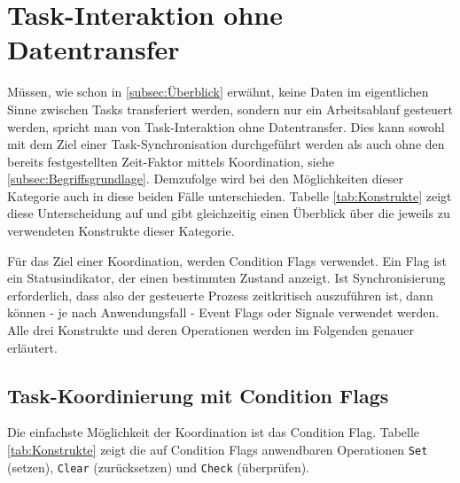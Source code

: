 \documentclass{llncs}
\begin{document}
\section{Task-Interaktion ohne Datentransfer}
\label{sub:Task_Interaktion_ohne_Datentransfer}
Müssen, wie schon in \ref{subsec:Überblick} erwähnt, keine Daten im eigentlichen Sinne zwischen Tasks transferiert werden, sondern nur ein Arbeitsablauf gesteuert werden, spricht man von Task-Interaktion ohne Datentransfer. Dies kann sowohl mit dem Ziel einer Task-Synchronisation durchgeführt werden als auch ohne den bereits festgestellten Zeit-Faktor mittels Koordination, siehe \ref{subsec:Begriffsgrundlage}. Demzufolge wird bei den Möglichkeiten dieser Kategorie auch in diese beiden Fälle unterschieden. Tabelle \ref{tab:Konstrukte} zeigt diese Unterscheidung auf und gibt gleichzeitig einen Überblick über die jeweils zu verwendeten Konstrukte dieser Kategorie.
\begin{table}
	\centering %
	\def\arraystretch{1.5} %
	\setlength{\tabcolsep}{0.5em} %
\caption{\label{tab:Konstrukte} Koordinierungs- und Synchronisationskonstrukte \autocite[vgl.][82]{Cooling2017}}
\end{table}
Für das Ziel einer Koordination, werden Condition Flags verwendet. Ein Flag ist ein Statusindikator, der einen bestimmten Zustand anzeigt. Ist Synchronisierung erforderlich, dass also der gesteuerte Prozess zeitkritisch auszuführen ist, dann können - je nach Anwendungsfall - Event Flags oder Signale verwendet werden. Alle drei Konstrukte und deren Operationen werden im Folgenden genauer erläutert.

\subsection{Task-Koordinierung mit Condition Flags}
\label{subsec:Koordinierung_mit_Condition_Flags}
Die einfachste Möglichkeit der Koordination ist das Condition Flag. Tabelle \ref{tab:Konstrukte} zeigt die auf Condition Flags anwendbaren Operationen \texttt{Set} (setzen), \texttt{Clear} (zurücksetzen) und \texttt{Check} (überprüfen).
\end{document}
